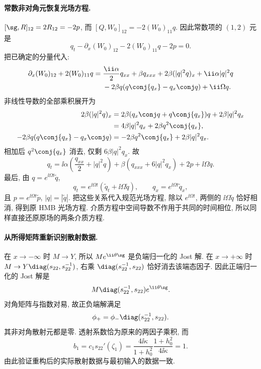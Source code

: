 \paragraph{常数非对角元恢复光场方程.}
$[\sg,R]_{12}=2R_{12}=-2p$,
而 $[Q,W_0]_{12}=-2(W_0)_{11}q$.
因此常数项的 $(1,2)$ 元是
\[
q_t-\partial_x(W_0)_{12}-2(W_0)_{11}q-2p=0.
\]
把已确定的分量代入:
\[
\begin{aligned}
\partial_x(W_0)_{12}+2(W_0)_{11}q
={}&\dfrac{\ii\alpha}{2}q_{xx}+\beta q_{xxx}
+2\beta(|q|^2q)_x+\ii\alpha|q|^2q\\
&-2\beta q(q\conj{q_x}-q_x\conj q)
+\ii\Omega q.
\end{aligned}
\]
非线性导数的全部乘积展开为
\[
\begin{aligned}
2\beta(|q|^2q)_x
&=2\beta(q_x\conj q+q\conj{q_x})q
+2\beta|q|^2q_x\\
&=4\beta|q|^2q_x+2\beta q^2\conj{q_x},\\
-2\beta q(q\conj{q_x}-q_x\conj q)
&=-2\beta q^2\conj{q_x}+2\beta|q|^2q_x.
\end{aligned}
\]
相加后 $q^2\conj{q_x}$ 消去, 仅剩 $6\beta|q|^2q_x$.
故
\[
q_t=\ii\alpha\left(\dfrac{q_{xx}}{2}+|q|^2q\right)
+\beta(q_{xxx}+6|q|^2q_x)+2p+\ii\Omega q.
\]
最后, 由 $q=e^{\ii\Omega t}\widetilde q$,
\[
q_t=e^{\ii\Omega t}
(\widetilde q_t+\ii\Omega\widetilde q),\qquad
q_x=e^{\ii\Omega t}\widetilde q_x,
\]
且 $p=e^{\ii\Omega t}\widetilde p$, $|q|=|\widetilde q|$.
把这些关系代入规范光场方程, 除以 $e^{\ii\Omega t}$,
两侧的 $\ii\Omega\widetilde q$ 恰好相消, 得到原 HMB 光场方程.
介质方程中空间导数不作用于共同的时间相位,
所以同样直接还原原场的两条介质方程.

\paragraph{从所得矩阵重新识别散射数据.}
在 $x\to-\infty$ 时 $M\to Y$,
所以 $Me^{\ii\theta\sg}$ 是负端归一化的 Jost 解.
在 $x\to+\infty$ 时
$M\to Y\diag(s_{22},s_{22}^{-1})$,
右乘 $\diag(s_{22}^{-1},s_{22})$ 恰好消去该端态因子.
因此正端归一化的 Jost 解是
\[
M\diag(s_{22}^{-1},s_{22})e^{\ii\theta\sg}.
\]
对角矩阵与指数对易, 故正负端解满足
\[
\phi_+=\phi_-\diag(s_{22}^{-1},s_{22}).
\]
其非对角散射元都是零.
透射系数恰为原来的两因子乘积,
而
\[
b_1=c_1s_{22}'(\zeta_1)
=\dfrac{4\ii\kappa}{1+h_0^2}
\dfrac{1+h_0^2}{4\ii\kappa}=1.
\]
由此验证重构后的实际散射数据与最初输入的数据一致.


